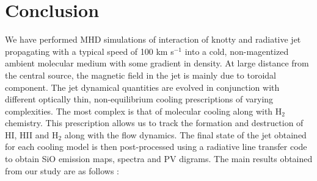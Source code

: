 \documentclass[useAMS,usenatbib,letters]{mn2e}
\begin{document}
 
\section{Conclusion}
We have performed MHD simulations
of interaction of knotty and radiative jet propagating 
with a typical speed of 100 km s$^{-1}$ into a cold, non-magentized ambient
molecular medium with some gradient in density. At large distance from
the central source, the magnetic field in the jet is mainly due to
toroidal component. The jet dynamical quantities are evolved in conjunction
with different optically thin, non-equilibrium cooling prescriptions of varying complexities. 
The most complex is that of molecular cooling along with
H$_2$ chemistry. This prescription allows us to track the formation
and destruction of HI, HII and H$_2$ along with the flow dynamics. 
The final state of the jet obtained for each cooling model is then
post-processed using a radiative line transfer code to
obtain SiO emission maps, spectra and PV digrams. The main results
obtained from our study are as follows :
\end{document}
